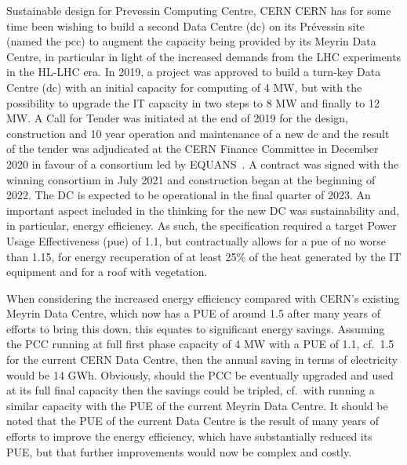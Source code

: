 \documentclass[../SustainableHEP.tex]{subfiles}
\begin{document}
\begin{bestpractice}{Sustainable design for Prevessin Computing Centre, CERN}%
CERN has for some time been wishing to build a second Data Centre (\acrshort{dc}) on its Pr\'{e}vessin site (named the \acrshort{pcc}) to augment the capacity being provided by its Meyrin Data Centre, in particular in light of the increased demands from the LHC experiments in the HL-LHC era.
In 2019, a project was approved to build a turn-key Data Centre (\acrshort{dc}) with an initial capacity for computing of 4 MW, but with the possibility to upgrade the IT capacity in two steps to 8 MW and finally to 12 MW. 
A Call for Tender was initiated at the end of 2019 for the design, construction and 10 year operation and
maintenance of a new \acrshort{dc} and the result of the tender was
adjudicated at the CERN Finance Committee in December 2020 in favour of a consortium led by EQUANS~\cite{EQUANS}. A contract was signed with the winning
consortium in July 2021 and construction began at the beginning of 2022.
The DC is expected to be operational in the final quarter of 2023. An
important aspect included in the thinking for the new DC was
sustainability and, in particular, energy efficiency. As such, the
specification required a target Power Usage Effectiveness (\acrshort{pue}) of 1.1,
but contractually allows for a \acrshort{pue} of no worse than 1.15, for energy
recuperation of at least 25\% of the heat generated by the IT equipment
and for a roof with vegetation.

When considering the increased energy efficiency compared with CERN's
existing Meyrin Data Centre, which now has a PUE of around 1.5 after
many years of efforts to bring this down, this equates to significant
energy savings. Assuming the PCC running at full first phase capacity of
4 MW with a PUE of 1.1, cf.~1.5 for the current CERN Data Centre, then
the annual saving in terms of electricity would be 14 GWh. Obviously,
should the PCC be eventually upgraded and used at its full final
capacity then the savings could be tripled, cf.~with running a similar
capacity with the PUE of the current Meyrin Data Centre. It should be
noted that the PUE of the current Data Centre is the result of many
years of efforts to improve the energy efficiency, which have
substantially reduced its PUE, but that further improvements would now
be complex and costly.


\end{bestpractice}
\end{document}

